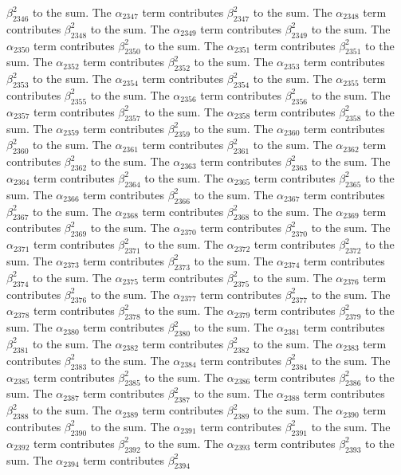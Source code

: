 \begin{lemma}
$\beta_{2346}^{2}$ to the sum. The $\alpha_{2347}$ term contributes $\beta_{2347}^{2}$ to the sum. The $\alpha_{2348}$ term contributes $\beta_{2348}^{2}$ to the sum. The $\alpha_{2349}$ term contributes $\beta_{2349}^{2}$ to the sum. The $\alpha_{2350}$ term contributes $\beta_{2350}^{2}$ to the sum. The $\alpha_{2351}$ term contributes $\beta_{2351}^{2}$ to the sum. The $\alpha_{2352}$ term contributes $\beta_{2352}^{2}$ to the sum. The $\alpha_{2353}$ term contributes $\beta_{2353}^{2}$ to the sum. The $\alpha_{2354}$ term contributes $\beta_{2354}^{2}$ to the sum. The $\alpha_{2355}$ term contributes $\beta_{2355}^{2}$ to the sum. The $\alpha_{2356}$ term contributes $\beta_{2356}^{2}$ to the sum. The $\alpha_{2357}$ term contributes $\beta_{2357}^{2}$ to the sum. The $\alpha_{2358}$ term contributes $\beta_{2358}^{2}$ to the sum. The $\alpha_{2359}$ term contributes $\beta_{2359}^{2}$ to the sum. The $\alpha_{2360}$ term contributes $\beta_{2360}^{2}$ to the sum. The $\alpha_{2361}$ term contributes $\beta_{2361}^{2}$ to the sum. The $\alpha_{2362}$ term contributes $\beta_{2362}^{2}$ to the sum. The $\alpha_{2363}$ term contributes $\beta_{2363}^{2}$ to the sum. The $\alpha_{2364}$ term contributes $\beta_{2364}^{2}$ to the sum. The $\alpha_{2365}$ term contributes $\beta_{2365}^{2}$ to the sum. The $\alpha_{2366}$ term contributes $\beta_{2366}^{2}$ to the sum. The $\alpha_{2367}$ term contributes $\beta_{2367}^{2}$ to the sum. The $\alpha_{2368}$ term contributes $\beta_{2368}^{2}$ to the sum. The $\alpha_{2369}$ term contributes $\beta_{2369}^{2}$ to the sum. The $\alpha_{2370}$ term contributes $\beta_{2370}^{2}$ to the sum. The $\alpha_{2371}$ term contributes $\beta_{2371}^{2}$ to the sum. The $\alpha_{2372}$ term contributes $\beta_{2372}^{2}$ to the sum. The $\alpha_{2373}$ term contributes $\beta_{2373}^{2}$ to the sum. The $\alpha_{2374}$ term contributes $\beta_{2374}^{2}$ to the sum. The $\alpha_{2375}$ term contributes $\beta_{2375}^{2}$ to the sum. The $\alpha_{2376}$ term contributes $\beta_{2376}^{2}$ to the sum. The $\alpha_{2377}$ term contributes $\beta_{2377}^{2}$ to the sum. The $\alpha_{2378}$ term contributes $\beta_{2378}^{2}$ to the sum. The $\alpha_{2379}$ term contributes $\beta_{2379}^{2}$ to the sum. The $\alpha_{2380}$ term contributes $\beta_{2380}^{2}$ to the sum. The $\alpha_{2381}$ term contributes $\beta_{2381}^{2}$ to the sum. The $\alpha_{2382}$ term contributes $\beta_{2382}^{2}$ to the sum. The $\alpha_{2383}$ term contributes $\beta_{2383}^{2}$ to the sum. The $\alpha_{2384}$ term contributes $\beta_{2384}^{2}$ to the sum. The $\alpha_{2385}$ term contributes $\beta_{2385}^{2}$ to the sum. The $\alpha_{2386}$ term contributes $\beta_{2386}^{2}$ to the sum. The $\alpha_{2387}$ term contributes $\beta_{2387}^{2}$ to the sum. The $\alpha_{2388}$ term contributes $\beta_{2388}^{2}$ to the sum. The $\alpha_{2389}$ term contributes $\beta_{2389}^{2}$ to the sum. The $\alpha_{2390}$ term contributes $\beta_{2390}^{2}$ to the sum. The $\alpha_{2391}$ term contributes $\beta_{2391}^{2}$ to the sum. The $\alpha_{2392}$ term contributes $\beta_{2392}^{2}$ to the sum. The $\alpha_{2393}$ term contributes $\beta_{2393}^{2}$ to the sum. The $\alpha_{2394}$ term contributes $\beta_{2394}^{2}$ 
\end{lemma}
